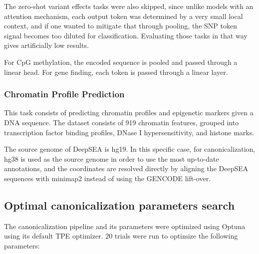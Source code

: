 \documentclass[   ]{article}
\begin{document}
The zero-shot variant effects tasks were also skipped, since unlike
models with an attention mechanism, each output token was determined by
a very small local context, and if one wanted to mitigate that through
pooling, the SNP token signal becomes too diluted for classification.
Evaluating those tasks in that way gives artificially low results.

For CpG methylation, the encoded sequence is pooled and passed through a linear head. For gene finding, each token is passed through a linear layer.

\subsubsection{Chromatin Profile Prediction}
This task \citep{zhouPredictingEffectsNoncoding2015} consists of predicting
chromatin profiles and epigenetic markers given a DNA sequence. The
dataset consists of 919 chromatin features, grouped into transcription
factor binding profiles, DNase I hypersensitivity, and histone marks.

The source genome of DeepSEA is hg19. In this specific case, for
canonicalization, hg38 is used as the source genome in order to use the
most up-to-date annotations, and the coordinates are resolved directly
by aligning the DeepSEA sequences with minimap2
\citep{liMinimap2PairwiseAlignment2018} instead of using the GENCODE
lift-over.

\subsection{Optimal canonicalization parameters search}
\label{sec:methods_optimal_canonicalization_search}

The canonicalization pipeline and its parameters were optimized using Optuna \citep{akibaOptunaNextgenerationHyperparameter2019} using its default TPE optimizer. 20 trials were run to optimize the following parameters:
\end{document}
